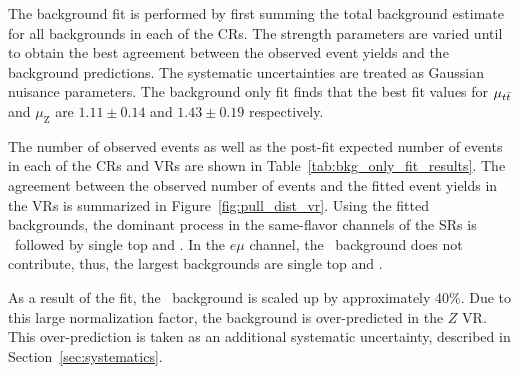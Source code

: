 The background fit is performed by first summing the total background estimate
for all backgrounds in each of the CRs.
The strength parameters are varied until to obtain the best agreement between
the observed event yields and the background predictions.
The systematic uncertainties are treated as Gaussian nuisance parameters.
The background only fit finds that the best fit values for $\mu_{t\bar{t}}$ and
$\mu_\mathrm{Z}$ are $1.11 \pm 0.14$ and $1.43 \pm 0.19$ respectively.

The number of observed events as well as the post-fit expected number
of events in each of the CRs and VRs are shown in
Table~\ref{tab:bkg_only_fit_results}.
The agreement between the observed number of events and the fitted event
yields in the VRs is summarized in Figure~\ref{fig:pull_dist_vr}.
Using the fitted backgrounds, the dominant process in the same-flavor
channels of the SRs is \ZGAMMAJETS\ followed by single top and
\TTBAR. In the $e\mu$ channel, the \ZGAMMAJETS\ background does
not contribute, thus, the largest backgrounds are single top and \TTBAR.

As a result of the fit, the \ZGAMMAJETS\ background is scaled up by
approximately 40\%. Due to this large normalization factor, the background is
over-predicted in the $Z$ VR. This over-prediction is taken as an additional
systematic uncertainty, described in Section~\ref{sec:systematics}.


